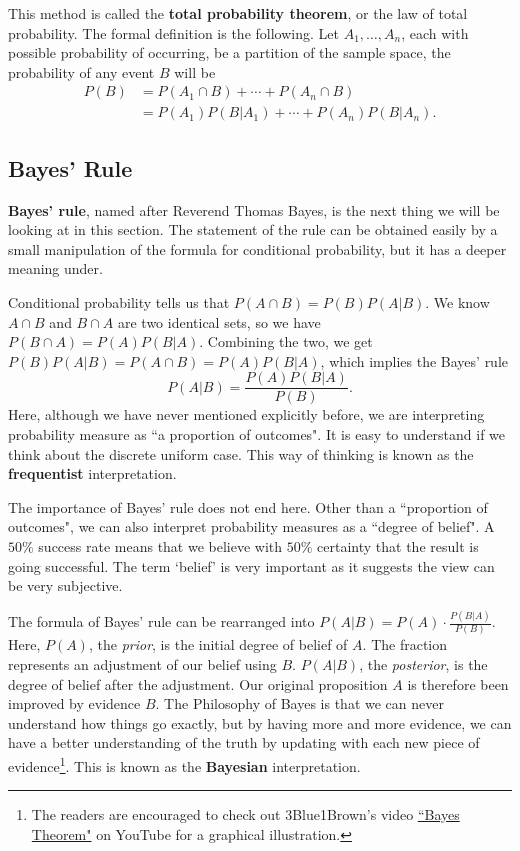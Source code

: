 \documentclass[11pt, a4paper, oneside]{book}
\theoremstyle{definition}
\begin{document}
\noindent This method is called the \textbf{total probability theorem}, or the law of total probability. The formal definition is the following. Let $A_1, \dots, A_n$, each with possible probability of occurring, be a partition of the sample space, the probability of any event $B$ will be 
\begin{equation*}
\begin{split}
P(B) &= P(A_1 \cap B) + \cdots + P(A_n \cap B) \\
&= P(A_1)P(B|A_1) + \cdots + P(A_n)P(B|A_n).
\end{split}
\end{equation*}

\subsection{Bayes' Rule}

\noindent \textbf{Bayes' rule}, named after Reverend Thomas Bayes, is the next thing we will be looking at in this section. The statement of the rule can be obtained easily by a small manipulation of the formula for conditional probability, but it has a deeper meaning under. 

\noindent Conditional probability tells us that $P(A \cap B)=P(B)P(A|B)$. We know $A \cap B$ and $B \cap A$ are two identical sets, so we have $P(B \cap A)=P(A)P(B|A)$. Combining the two, we get $P(B)P(A|B)=P(A \cap B)=P(A)P(B|A)$, which implies the Bayes' rule \[
P(A|B) = \frac{P(A)P(B|A)}{P(B)}.
\]
Here, although we have never mentioned explicitly before, we are interpreting probability measure as ``a proportion of outcomes". It is easy to understand if we think about the discrete uniform case. This way of thinking is known as the \textbf{frequentist} interpretation. 

\noindent The importance of Bayes' rule does not end here. Other than a ``proportion of outcomes", we can also interpret probability measures as a ``degree of belief". A $50\%$ success rate means that we believe with $50\%$ certainty that the result is going successful. The term `belief' is very important as it suggests the view can be very subjective. 

\noindent The formula of Bayes' rule can be rearranged into $P(A|B) = P(A) \cdot \frac{P(B|A)}{P(B)}$. Here, $P(A)$, the \emph{prior}, is the initial degree of belief of $A$. The fraction represents an adjustment of our belief using $B$. $P(A|B)$, the \emph{posterior}, is the degree of belief after the adjustment. Our original proposition $A$ is therefore been improved by evidence $B$. The Philosophy of Bayes is that we can never understand how things go exactly, but by having more and more evidence, we can have a better understanding of the truth by updating with each new piece of evidence\footnote{The readers are encouraged to check out 3Blue1Brown's video \href{https://youtu.be/HZGCoVF3YvM}{``Bayes Theorem"} on YouTube for a graphical illustration.}. This is known as the \textbf{Bayesian} interpretation. 
\end{document}
